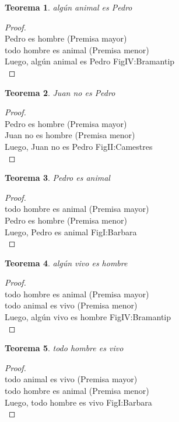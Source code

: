 ﻿\documentclass[12pt]{book}
\newtheorem{theorem}{Teorema}[chapter]
\newtheorem{proof}{Demostración}
\begin{document}
\begin{theorem}
algún animal es Pedro
\label{th: 11}
\end{theorem}\begin{proof}\\Pedro es hombre	 (Premisa mayor) \\todo hombre es animal	 (Premisa menor) \\Luego, algún animal es Pedro	FigIV:Bramantip \\ \end{proof}
\begin{theorem}
Juan no es Pedro
\label{th: 12}
\end{theorem}\begin{proof}\\Pedro es hombre	 (Premisa mayor) \\Juan no es hombre	 (Premisa menor) \\Luego, Juan no es Pedro	FigII:Camestres \\ \end{proof}
\begin{theorem}
Pedro es animal
\label{th: 13}
\end{theorem}\begin{proof}\\todo hombre es animal	 (Premisa mayor) \\Pedro es hombre	 (Premisa menor) \\Luego, Pedro es animal	FigI:Barbara \\ \end{proof}
\begin{theorem}
algún vivo es hombre
\label{th: 14}
\end{theorem}\begin{proof}\\todo hombre es animal	 (Premisa mayor) \\todo animal es vivo	 (Premisa menor) \\Luego, algún vivo es hombre	FigIV:Bramantip \\ \end{proof}
\begin{theorem}
todo hombre es vivo
\label{th: 15}
\end{theorem}\begin{proof}\\todo animal es vivo	 (Premisa mayor) \\todo hombre es animal	 (Premisa menor) \\Luego, todo hombre es vivo	FigI:Barbara \\ \end{proof}
\end{document}
